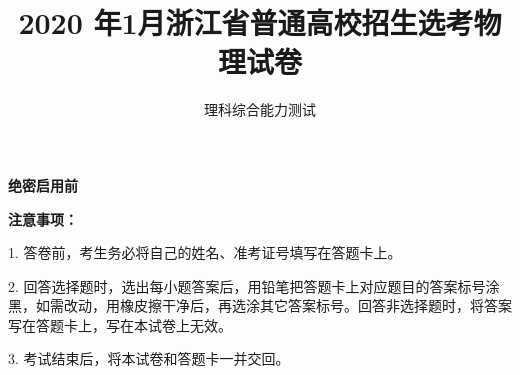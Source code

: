 \documentclass[list,mac]{BHCexam}
\begin{document}
\textbf{绝密启用前} 
\title{2020 年1月浙江省普通高校招生选考物理试卷}
\subtitle{理科综合能力测试}
\maketitle

\textbf{注意事项：} 
\setlength\parindent{2em}

1. 答卷前，考生务必将自己的姓名、准考证号填写在答题卡上。

2. 回答选择题时，选出每小题答案后，用铅笔把答题卡上对应题目的答案标号涂黑，如需改动，用橡皮擦干净后，再选涂其它答案标号。回答非选择题时，将答案写在答题卡上，写在本试卷上无效。

3. 考试结束后，将本试卷和答题卡一并交回。

\begin{groups}


\begin{questions}[30s]

\end{questions}


\begin{questions}[p]

\end{questions}



\end{groups}
\label{lastpage}
\end{document}
